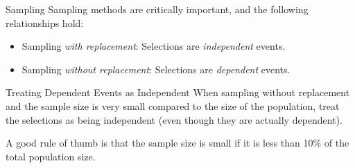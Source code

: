 \documentclass{beamer}
\begin{document}
\begin{frame}
\begin{block}{Sampling}
Sampling methods are critically important, and the following relationships hold:
\begin{itemize}
\item Sampling \emph{with replacement}: Selections are \emph{independent} events.
\item Sampling \emph{without replacement}: Selections are \emph{dependent} events.
\end{itemize}
\end{block}\pause

\begin{block}{Treating Dependent Events as Independent}
When sampling without replacement and the sample size is very small compared to the size of the population, treat the selections as being independent (even though they are actually dependent).
\end{block}\pause

\begin{note}
A good rule of thumb is that the sample size is small if it is less than 10\% of the total population size.
\end{note}
\end{frame}
\end{document}
